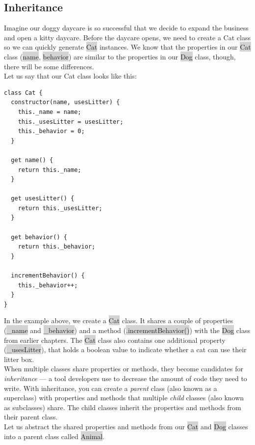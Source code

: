 \documentclass[11pt]{article}
\begin{document}
\subsection{Inheritance}
Imagine our doggy daycare is so successful that we decide to expand the business and open a kitty daycare. Before the daycare opens, we need to create a Cat class so we can quickly generate \colorbox{lightgray}{Cat} instances. We know that the properties in our \colorbox{lightgray}{Cat} class (\colorbox{lightgray}{name}, \colorbox{lightgray}{behavior}) are similar to the properties in our \colorbox{lightgray}{Dog} class, though, there will be some differences. \\
\newline
Let us say that our Cat class looks like this:
\begin{lstlisting}
class Cat {
  constructor(name, usesLitter) {
    this._name = name;
    this._usesLitter = usesLitter;
    this._behavior = 0;
  }

  get name() {
    return this._name;
  }

  get usesLitter() {
    return this._usesLitter;
  }

  get behavior() {
    return this._behavior;
  }  

  incrementBehavior() {
    this._behavior++;
  }
}
\end{lstlisting}
In the example above, we create a \colorbox{lightgray}{Cat} class. It shares a couple of properties (\colorbox{lightgray}{\_name} and \colorbox{lightgray}{\_behavior}) and a method (\colorbox{lightgray}{.incrementBehavior()}) with the \colorbox{lightgray}{Dog} class from earlier chapters. The \colorbox{lightgray}{Cat} class also contains one additional property (\colorbox{lightgray}{\_usesLitter}), that holds a boolean value to indicate whether a cat can use their litter box. \\
\newline
When multiple classes share properties or methods, they become candidates for \textit{inheritance} — a tool developers use to decrease the amount of code they need to write. With inheritance, you can create a \textit{parent} class (also known as a superclass) with properties and methods that multiple \textit{child} classes (also known as subclasses) share. The child classes inherit the properties and methods from their parent class. \\
\newline
Let us abstract the shared properties and methods from our \colorbox{lightgray}{Cat} and \colorbox{lightgray}{Dog} classes into a parent class called \colorbox{lightgray}{Animal}. 
\end{document}
